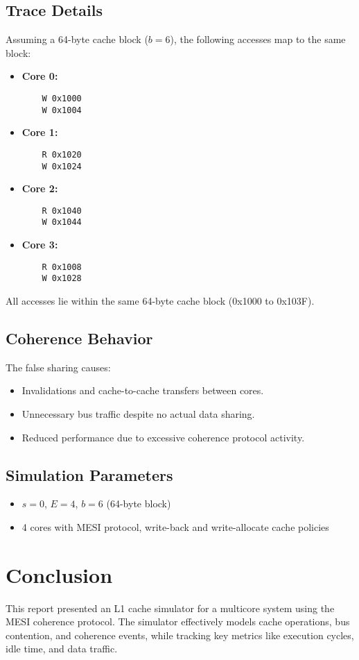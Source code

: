 \documentclass[a4paper,12pt]{article}
\begin{document}
\subsection*{Trace Details}
\vspace{-3pt}
Assuming a 64-byte cache block ($b = 6$), the following accesses map to the same block:

\begin{itemize}[noitemsep]
    \item \textbf{Core 0:}
    \begin{verbatim}
    W 0x1000
    W 0x1004
    \end{verbatim}
    \item \textbf{Core 1:}
    \begin{verbatim}
    R 0x1020
    W 0x1024
    \end{verbatim}
    \item \textbf{Core 2:}
    \begin{verbatim}
    R 0x1040
    W 0x1044
    \end{verbatim}
    \item \textbf{Core 3:}
    \begin{verbatim}
    R 0x1008
    W 0x1028
    \end{verbatim}
\end{itemize}

\vspace{-5pt}
All accesses lie within the same 64-byte cache block (0x1000 to 0x103F).

\vspace{5pt}
\subsection*{Coherence Behavior}
\vspace{-3pt}
The false sharing causes:
\begin{itemize}[noitemsep]
    \item Invalidations and cache-to-cache transfers between cores.
    \item Unnecessary bus traffic despite no actual data sharing.
    \item Reduced performance due to excessive coherence protocol activity.
\end{itemize}

\vspace{5pt}
\subsection*{Simulation Parameters}
\vspace{-3pt}
\begin{itemize}[noitemsep]
    \item $s = 0$, $E = 4$, $b = 6$ (64-byte block)
    \item 4 cores with MESI protocol, write-back and write-allocate cache policies
\end{itemize}

\section{Conclusion}

This report presented an L1 cache simulator for a multicore system using the MESI coherence protocol. The simulator effectively models cache operations, bus contention, and coherence events, while tracking key metrics like execution cycles, idle time, and data traffic.
\end{document}
